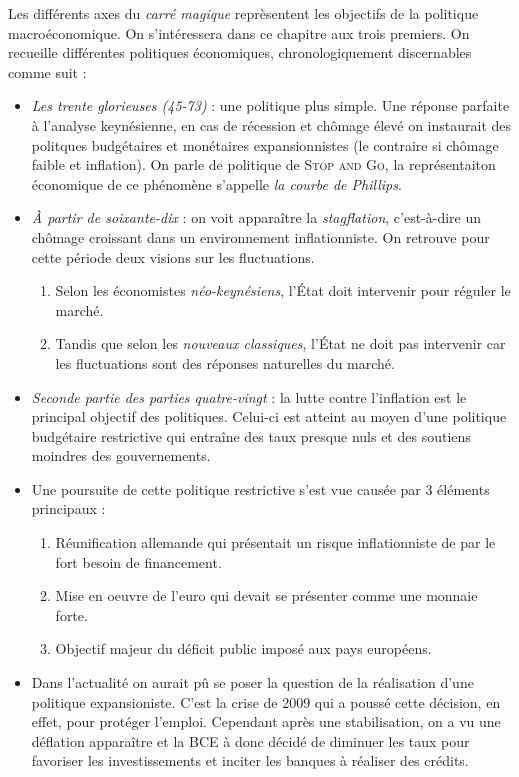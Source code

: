 Les différents axes du \emph{carré magique} reprèsentent les objectifs de la politique macroéconomique. 
On s'intéressera dans ce chapitre aux trois premiers. 
On recueille différentes politiques économiques, chronologiquement discernables comme suit : 
\begin{itemize}[label=]
	\item \emph{Les trente glorieuses (45-73)} : une politique plus simple. 
  Une réponse parfaite à l'analyse keynésienne, en cas de récession et chômage élevé
	on instaurait des politques budgétaires et monétaires expansionnistes (le contraire si chômage faible
  et inflation). On parle de politique de \textsc{Stop and Go}, la représentaiton économique 
  de ce phénomène s'appelle \emph{la courbe de Phillips}.
	\item \emph{À partir de soixante-dix} : on voit apparaître la \emph{stagflation}, c'est-à-dire un
  chômage croissant dans un environnement inflationniste. On retrouve pour cette période deux visions
  sur les fluctuations.
  \begin{enumerate}
    \item Selon les économistes \emph{néo-keynésiens}, l'État doit intervenir pour réguler le marché.
    \item Tandis que selon les \emph{nouveaux classiques}, l'État ne doit pas intervenir car les fluctuations
    sont des réponses naturelles du marché.
  \end{enumerate}
  \item \emph{Seconde partie des parties quatre-vingt} : la lutte contre l'inflation est le principal
  objectif des politiques. Celui-ci est atteint au moyen d'une politique budgétaire restrictive
  qui entraîne des taux presque nuls et des soutiens moindres des gouvernements.
  \item Une poursuite de cette politique restrictive s'est vue causée par 3 éléments principaux : 
  \begin{enumerate}
  	\item Réunification allemande qui présentait un risque inflationniste de par le fort besoin de financement.
  	\item Mise en oeuvre de l'euro qui devait se présenter comme une monnaie forte.
  	\item Objectif majeur du déficit public imposé aux pays européens.
  \end{enumerate}
  \item Dans l'actualité on aurait pû se poser la question de la réalisation d'une politique expansioniste. C'est la crise de 2009 qui a poussé cette décision,
  en effet, pour protéger l'emploi. Cependant après une stabilisation, on a vu une déflation apparaître et la BCE à donc décidé de diminuer les taux pour 
  favoriser les investissements et inciter les banques à réaliser des crédits.
\end{itemize}

